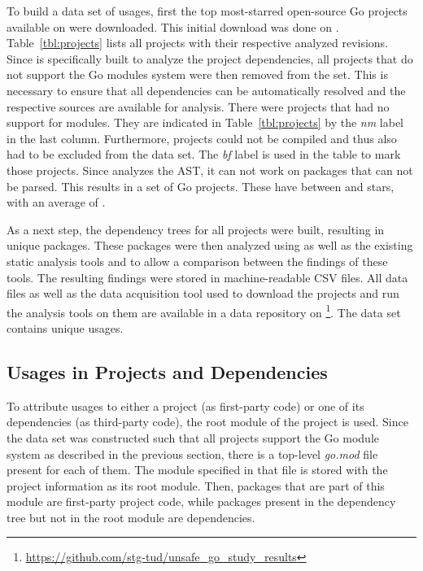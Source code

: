 To build a data set of \unsafe{} usages, first the top \projsTotal{} most-starred open-source Go projects available on
\github{} were downloaded.
This initial download was done on .
Table~\ref{tbl:projects} lists all projects with their respective analyzed revisions.
Since \toolGeiger{} is specifically built to analyze the project dependencies, all projects that do not support the Go
modules system were then removed from the set.
This is necessary to ensure that all dependencies can be automatically resolved and the respective sources are available
for analysis.
There were \projsWithoutModules{} projects that had no support for modules.
They are indicated in Table~\ref{tbl:projects} by the \textit{nm} label in the last column.
Furthermore, \projsNotCompiled{} projects could not be compiled and thus also had to be excluded from the data set.
The \textit{bf} label is used in the table to mark those projects.
Since \toolGeiger{} analyzes the \acrshort{AST}, it can not work on packages that can not be parsed.
This results in a set of \projsAnalyzed{} Go projects.
These have between  and  stars, with an average of .

As a next step, the dependency trees for all projects were built, resulting in \packagesAnalyzed{} unique packages.
These packages were then analyzed using \toolGeiger{} as well as the existing static analysis tools \toolVet{} and
\toolGosec{} to allow a comparison between the findings of these tools.
The resulting findings were stored in machine-readable \acrshort{CSV} files.
All data files as well as the data acquisition tool used to download the projects and run the analysis tools on them
are available in a data repository on \github{}\footnote{\url{https://github.com/stg-tud/unsafe_go_study_results}}.
The data set contains \uniqueUnsafeFindings{} unique \unsafe{} usages.



\subsection{Usages in Projects and Dependencies}\label{subsec:go-geiger:evaluation:unsafe-usage}

To attribute \unsafe{} usages to either a project (as first-party code) or one of its dependencies (as third-party
code), the root module of the project is used.
Since the data set was constructed such that all projects support the Go module system as described in the previous
section, there is a top-level \textit{go.mod} file present for each of them.
The module specified in that file is stored with the project information as its root module.
Then, packages that are part of this module are first-party project code, while packages present in the dependency tree
but not in the root module are dependencies.

